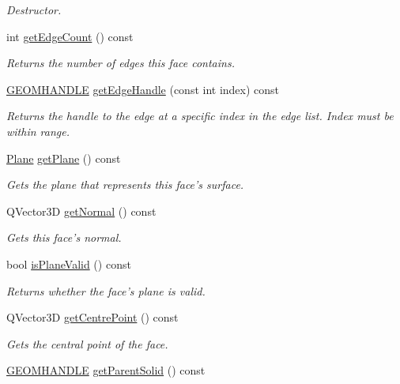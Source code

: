 \begin{DoxyCompactItemize}
\begin{DoxyCompactList}\small\item\em Destructor. \end{DoxyCompactList}\item 
int \hyperlink{class_face3_d_a83db8beee23e03ff24cd9b0649e8269c}{get\-Edge\-Count} () const 
\begin{DoxyCompactList}\small\item\em Returns the number of edges this face contains. \end{DoxyCompactList}\item 
\hyperlink{vertex_8h_a72202e57358ed73cd212e9a2eaf39aeb}{G\-E\-O\-M\-H\-A\-N\-D\-L\-E} \hyperlink{class_face3_d_a7a44b794e450e4e9784484876e10710b}{get\-Edge\-Handle} (const int index) const 
\begin{DoxyCompactList}\small\item\em Returns the handle to the edge at a specific index in the edge list. Index must be within range. \end{DoxyCompactList}\item 
\hyperlink{class_plane}{Plane} \hyperlink{class_face3_d_a1e3d068cffc33876100a3affc496e8eb}{get\-Plane} () const 
\begin{DoxyCompactList}\small\item\em Gets the plane that represents this face's surface. \end{DoxyCompactList}\item 
Q\-Vector3\-D \hyperlink{class_face3_d_a0dfbcd5b1fa9fd18d2b09064d5dff8ac}{get\-Normal} () const 
\begin{DoxyCompactList}\small\item\em Gets this face's normal. \end{DoxyCompactList}\item 
bool \hyperlink{class_face3_d_a9e8a8bcd2337cc8aeaa231aba7c5996b}{is\-Plane\-Valid} () const 
\begin{DoxyCompactList}\small\item\em Returns whether the face's plane is valid. \end{DoxyCompactList}\item 
Q\-Vector3\-D \hyperlink{class_face3_d_a34bc3d8aeb903d18d3f05b6af299fdff}{get\-Centre\-Point} () const 
\begin{DoxyCompactList}\small\item\em Gets the central point of the face. \end{DoxyCompactList}\item 
\hyperlink{vertex_8h_a72202e57358ed73cd212e9a2eaf39aeb}{G\-E\-O\-M\-H\-A\-N\-D\-L\-E} \hyperlink{class_face3_d_a84bf13a7355baeeedf35b6da66c064ec}{get\-Parent\-Solid} () const 

\end{DoxyCompactItemize}
